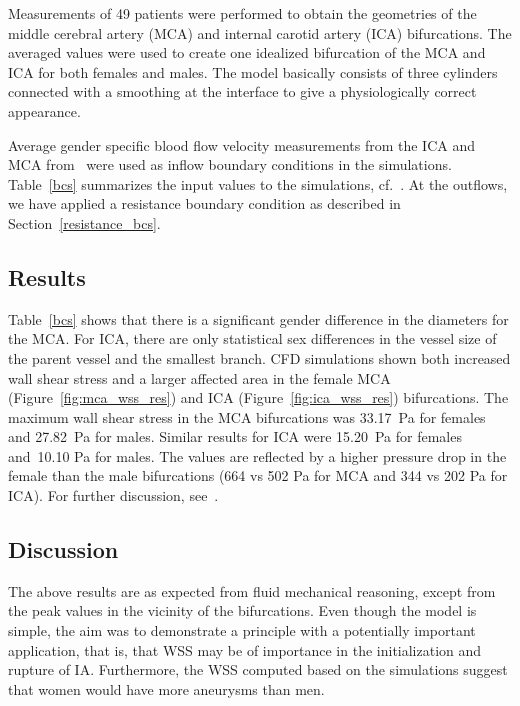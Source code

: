 Measurements of 49 patients were performed to obtain the geometries of
the middle cerebral artery (MCA) and internal carotid artery (ICA)
bifurcations. The averaged values were used to create one idealized
bifurcation of the MCA and ICA for both females and males. The model
basically consists of three cylinders connected with a smoothing at
the interface to give a physiologically correct appearance.

Average gender specific blood flow velocity measurements from the ICA
and MCA from~\cite{KrejzaSzydlikLiebeskindEtAl2005} were used as inflow boundary conditions in
the simulations. Table~\ref{bcs} summarizes the input values to the
simulations, cf.~\cite{IsaksenValen-SendstadMardalEtAl2008-sex}.  At the outflows, we have applied a
resistance boundary condition as described in
Section~\ref{resistance_bcs}.

\subsection{Results}

Table~\ref{bcs} shows that there is a significant gender difference in
the diameters for the MCA. For ICA,  there are only
statistical sex differences in the vessel size of the parent vessel
and the smallest branch. CFD simulations shown both increased wall
shear stress and a larger affected area in the female MCA
(Figure~\ref{fig:mca_wss_res}) and ICA (Figure~\ref{fig:ica_wss_res})
bifurcations. The maximum wall shear stress in the MCA bifurcations
was 33.17~Pa for females and 27.82~Pa for males. Similar results for
ICA were 15.20~Pa for females and~10.10 Pa for males. The values are
reflected by a higher pressure drop in the female than the male
bifurcations (664 vs 502 Pa for MCA and 344 vs 202 Pa for ICA). For
further discussion, see~\cite{IsaksenValen-SendstadMardalEtAl2008-sex}.

\subsection{Discussion}

The above results are as expected from fluid mechanical reasoning,
except from the peak values in the vicinity of the bifurcations. Even
though the model is simple, the aim was to demonstrate a principle
with a potentially important application, that is, that WSS may be of
importance in the initialization and rupture of IA.  Furthermore, the
WSS computed based on the simulations suggest that women would have
more aneurysms than men.


